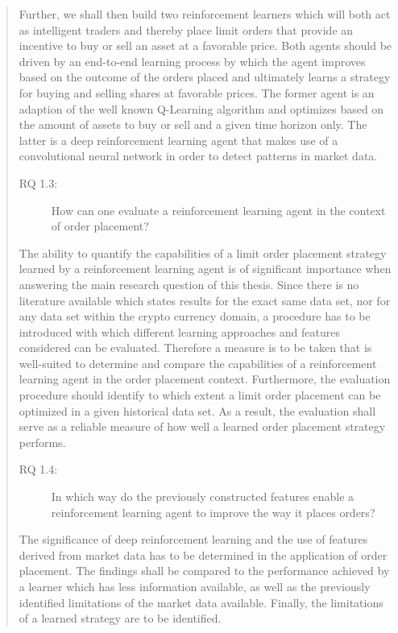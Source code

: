 \begin{quote}
    Further, we shall then build two reinforcement learners which will both act as intelligent traders and thereby place limit orders that provide an incentive to buy or sell an asset at a favorable price.
    Both agents should be driven by an end-to-end learning process by which the agent improves based on the outcome of the orders placed and ultimately learns a strategy for  buying and selling shares at favorable prices.
    The former agent is an adaption of the well known Q-Learning algorithm and optimizes based on the amount of assets to buy or sell and a given time horizon only.
    The latter is a deep reinforcement learning agent that makes use of a convolutional neural network in order to detect patterns in market data.

\begin{description}
    \item[RQ 1.3:] How can one evaluate a reinforcement learning agent in the context of order placement?
\end{description}
    The ability to quantify the capabilities of a limit order placement strategy learned by a reinforcement learning agent is of significant importance when answering the main research question of this thesis.
    Since there is no literature available which states results for the exact same data set, nor for any data set within the crypto currency domain, a procedure has to be introduced with which different learning approaches and features considered can be evaluated.
    Therefore a measure is to be taken that is well-suited to determine and compare the capabilities of a reinforcement learning agent in the order placement context.
    Furthermore, the evaluation procedure should identify to which extent a limit order placement can be optimized in a given historical data set.
    As a result, the evaluation shall serve as a reliable measure of how well a learned order placement strategy performs.
    
\begin{description}
    \item[RQ 1.4:] In which way do the previously constructed features enable a reinforcement learning agent to improve the way it places orders?
\end{description}

    The significance of deep reinforcement learning and the use of features derived from market data has to be determined in the application of order placement.
    The findings shall be compared to the performance achieved by a learner which has less information available, as well as the previously identified limitations of the market data available.
    Finally, the limitations of a learned strategy are to be identified.
\end{quote}

